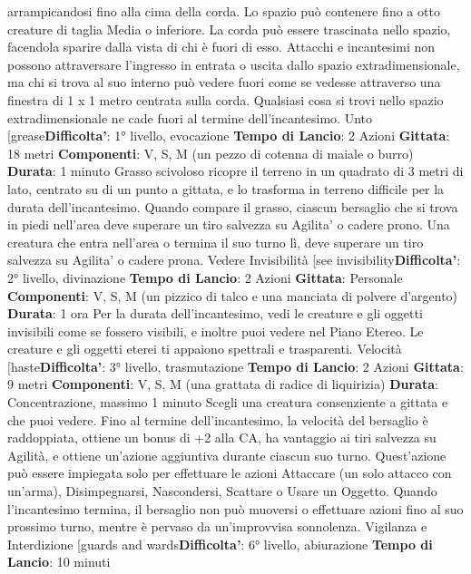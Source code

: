 \begin{multicols}{2}
arrampicandosi fino alla cima della corda. Lo spazio
può contenere fino a otto creature di taglia Media o
inferiore. La corda può essere trascinata nello spazio,
facendola sparire dalla vista di chi è fuori di esso.
Attacchi e incantesimi non possono attraversare
l’ingresso in entrata o uscita dallo spazio
extradimensionale, ma chi si trova al suo interno può
vedere fuori come se vedesse attraverso una finestra di
1 x 1 metro centrata sulla corda.
Qualsiasi cosa si trovi nello spazio extradimensionale
ne cade fuori al termine dell’incantesimo.
Unto
[grease\textbf{Difficolta'}:
1° livello, evocazione
\textbf{Tempo di Lancio}: 2 Azioni
\textbf{Gittata}: 18 metri
\textbf{Componenti}: V, S, M (un pezzo di cotenna di maiale o
burro)
\textbf{Durata}: 1 minuto
Grasso scivoloso ricopre il terreno in un quadrato di 3
metri di lato, centrato su di un punto a gittata, e lo
trasforma in terreno difficile per la durata
dell’incantesimo.
Quando compare il grasso, ciascun bersaglio che si
trova in piedi nell’area deve superare un tiro salvezza
su Agilita' o cadere prono. Una creatura che entra
nell’area o termina il suo turno lì, deve superare un tiro
salvezza su Agilita' o cadere prona.
Vedere Invisibilità
[see invisibility\textbf{Difficolta'}:
2° livello, divinazione
\textbf{Tempo di Lancio}: 2 Azioni
\textbf{Gittata}: Personale
\textbf{Componenti}: V, S, M (un pizzico di talco e una
manciata di polvere d’argento)
\textbf{Durata}: 1 ora
Per la durata dell’incantesimo, vedi le creature e gli
oggetti invisibili come se fossero visibili, e inoltre puoi
vedere nel Piano Etereo. Le creature e gli oggetti eterei
ti appaiono spettrali e trasparenti.
Velocità
[haste\textbf{Difficolta'}:
3° livello, trasmutazione
\textbf{Tempo di Lancio}: 2 Azioni
\textbf{Gittata}: 9 metri
\textbf{Componenti}: V, S, M (una grattata di radice di
liquirizia)
\textbf{Durata}: Concentrazione, massimo 1 minuto
Scegli una creatura consenziente a gittata e che puoi
vedere. Fino al termine dell’incantesimo, la velocità del
bersaglio è raddoppiata, ottiene un bonus di +2 alla CA,
ha vantaggio ai tiri salvezza su Agilità, e ottiene
un’azione aggiuntiva durante ciascun suo turno.
Quest’azione può essere impiegata solo per effettuare
le azioni Attaccare (un solo attacco con un’arma),
Disimpegnarsi, Nascondersi, Scattare o Usare un
Oggetto.
Quando l’incantesimo termina, il bersaglio non può
muoversi o effettuare azioni fino al suo prossimo turno,
mentre è pervaso da un’improvvisa sonnolenza.
Vigilanza e Interdizione
[guards and wards\textbf{Difficolta'}:
6° livello, abiurazione
\textbf{Tempo di Lancio}: 10 minuti

\end{multicols}
